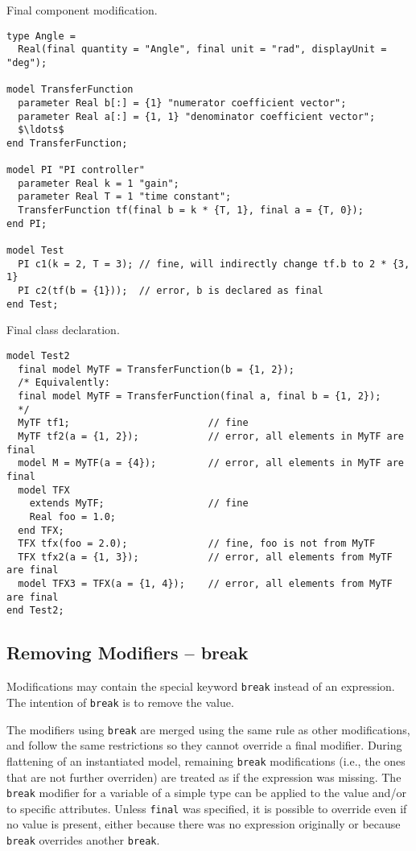 \begin{example}
Final component modification.
\begin{lstlisting}[language=modelica]
type Angle =
  Real(final quantity = "Angle", final unit = "rad", displayUnit = "deg");

model TransferFunction
  parameter Real b[:] = {1} "numerator coefficient vector";
  parameter Real a[:] = {1, 1} "denominator coefficient vector";
  $\ldots$
end TransferFunction;

model PI "PI controller"
  parameter Real k = 1 "gain";
  parameter Real T = 1 "time constant";
  TransferFunction tf(final b = k * {T, 1}, final a = {T, 0});
end PI;

model Test
  PI c1(k = 2, T = 3); // fine, will indirectly change tf.b to 2 * {3, 1}
  PI c2(tf(b = {1}));  // error, b is declared as final
end Test;
\end{lstlisting}
\end{example}

\begin{example}
Final class declaration.
\begin{lstlisting}[language=modelica]
model Test2
  final model MyTF = TransferFunction(b = {1, 2});
  /* Equivalently:
  final model MyTF = TransferFunction(final a, final b = {1, 2});
  */
  MyTF tf1;                        // fine
  MyTF tf2(a = {1, 2});            // error, all elements in MyTF are final
  model M = MyTF(a = {4});         // error, all elements in MyTF are final
  model TFX
    extends MyTF;                  // fine
    Real foo = 1.0;
  end TFX;
  TFX tfx(foo = 2.0);              // fine, foo is not from MyTF
  TFX tfx2(a = {1, 3});            // error, all elements from MyTF are final
  model TFX3 = TFX(a = {1, 4});    // error, all elements from MyTF are final
end Test2;
\end{lstlisting}
\end{example}


\subsection{Removing Modifiers -- break}\label{removing-modifiers-break}

Modifications may contain the special keyword \lstinline!break! instead of an expression.
The intention of \lstinline!break! is to remove the value.

The modifiers using \lstinline!break! are merged using the same rule as other modifications, and follow the same restrictions so they cannot override a final modifier.
During flattening of an instantiated model, remaining \lstinline!break! modifications (i.e., the ones that are not further overriden) are treated as if the expression was missing.
The \lstinline!break! modifier for a variable of a simple type can be applied to the value and/or to specific attributes.
Unless \lstinline!final! was specified, it is possible to override even if no value is present, either because there was no expression originally or because \lstinline!break! overrides another \lstinline!break!.


